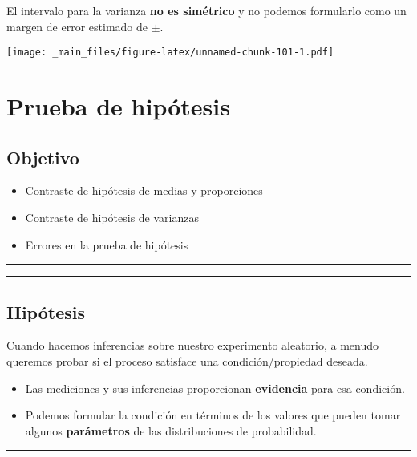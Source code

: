 \documentclass[
]{book}
\providecommand{\tightlist}{%
  \setlength{\itemsep}{0pt}\setlength{\parskip}{0pt}}
\begin{document}
El intervalo para la varianza \textbf{no es simétrico} y no podemos formularlo como un margen de error estimado de \(\pm\).

\texttt{[image: \_main\_files/figure-latex/unnamed-chunk-101-1.pdf]}

\hypertarget{prueba-de-hipuxf3tesis}{%
\chapter{Prueba de hipótesis}\label{prueba-de-hipuxf3tesis}}

\hypertarget{objetivo-13}{%
\section{Objetivo}\label{objetivo-13}}

\begin{itemize}
\tightlist
\item
  Contraste de hipótesis de medias y proporciones
\item
  Contraste de hipótesis de varianzas
\item
  Errores en la prueba de hipótesis
\end{itemize}

\begin{center}\rule{0.5\linewidth}{0.5pt}\end{center}

\begin{center}\rule{0.5\linewidth}{0.5pt}\end{center}

\hypertarget{hipuxf3tesis}{%
\section{Hipótesis}\label{hipuxf3tesis}}

Cuando hacemos inferencias sobre nuestro experimento aleatorio, a menudo queremos probar si el proceso satisface una condición/propiedad deseada.

\begin{itemize}
\item
  Las mediciones y sus inferencias proporcionan \textbf{evidencia} para esa condición.
\item
  Podemos formular la condición en términos de los valores que pueden tomar algunos \textbf{parámetros} de las distribuciones de probabilidad.
\end{itemize}

\begin{center}\rule{0.5\linewidth}{0.5pt}\end{center}
\end{document}
